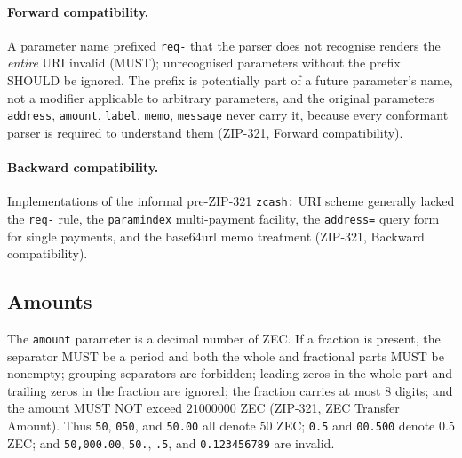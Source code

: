 \documentclass[11pt,a4paper]{article}
\theoremstyle{definition}
\begin{document}
\paragraph{Forward compatibility.} A parameter name prefixed \texttt{req-}
that the parser does not recognise renders the \emph{entire} URI invalid
(MUST); unrecognised parameters without the prefix SHOULD be ignored. The
prefix is potentially part of a future parameter's name, not a modifier
applicable to arbitrary parameters, and the original parameters
\texttt{address}, \texttt{amount}, \texttt{label}, \texttt{memo},
\texttt{message} never carry it, because every conformant parser is
required to understand them (ZIP-321, Forward compatibility).

\paragraph{Backward compatibility.} Implementations of the informal
pre-ZIP-321 \texttt{zcash:} URI scheme generally lacked the \texttt{req-}
rule, the \texttt{paramindex} multi-payment facility, the \texttt{address=}
query form for single payments, and the base64url memo treatment (ZIP-321,
Backward compatibility).

\subsection{Amounts}\label{sec:zip321-amount}

The \texttt{amount} parameter is a decimal number of ZEC. If a fraction is
present, the separator MUST be a period and both the whole and fractional
parts MUST be nonempty; grouping separators are forbidden; leading zeros in
the whole part and trailing zeros in the fraction are ignored; the fraction
carries at most $8$ digits; and the amount MUST NOT exceed $21000000$ ZEC
(ZIP-321, ZEC Transfer Amount). Thus \texttt{50}, \texttt{050}, and
\texttt{50.00} all denote $50$ ZEC; \texttt{0.5} and \texttt{00.500} denote
$0.5$ ZEC; and \texttt{50,000.00}, \texttt{50.}, \texttt{.5}, and
\texttt{0.123456789} are invalid.
\end{document}
